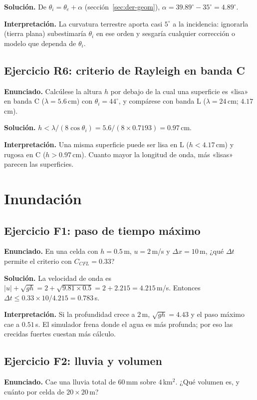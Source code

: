 \documentclass[11pt,a4paper]{article}
\begin{document}
\textbf{Solución.} De $\theta_i=\theta_e+\alpha$ (sección~\ref{sec:der-geom}), $\alpha=39.89^\circ-35^\circ=4.89^\circ$.

\textbf{Interpretación.} La curvatura terrestre aporta casi $5^\circ$ a la incidencia: ignorarla
(tierra plana) subestimaría $\theta_i$ en ese orden y sesgaría cualquier corrección o modelo que dependa de $\theta_i$.

\subsection*{Ejercicio R6: criterio de Rayleigh en banda C}
\textbf{Enunciado.} Calcúlese la altura $h$ por debajo de la cual una superficie es «lisa» en banda C
($\lambda=5.6$\,cm) con $\theta_i=44^\circ$, y compárese con banda L ($\lambda=24$\,cm; $4.17$\,cm).

\textbf{Solución.} $h<\lambda/(8\cos\theta_i)=5.6/(8\times0.7193)=0.97$\,cm.

\textbf{Interpretación.} Una misma superficie puede ser lisa en L ($h<4.17$\,cm) y rugosa en C ($h>0.97$\,cm).
Cuanto mayor la longitud de onda, más «lisas» parecen las superficies.

\section{Inundación}
\label{sec:ej-flood}

\subsection*{Ejercicio F1: paso de tiempo máximo}
\textbf{Enunciado.} En una celda con $h=0.5$\,m, $u=2$\,m/s y $\Delta x=10$\,m, ¿qué $\Delta t$ permite el
criterio con $C_{CFL}=0.33$?

\textbf{Solución.} La velocidad de onda es $|u|+\sqrt{gh}=2+\sqrt{9.81\times0.5}=2+2.215=4.215$\,m/s. Entonces
$\Delta t\le0.33\times10/4.215=0.783$\,s.

\textbf{Interpretación.} Si la profundidad crece a $2$\,m, $\sqrt{gh}=4.43$ y el paso máximo cae a $0.51$\,s. El
simulador frena donde el agua es más profunda; por eso las crecidas fuertes cuestan más cálculo.

\subsection*{Ejercicio F2: lluvia y volumen}
\textbf{Enunciado.} Cae una lluvia total de $60$\,mm sobre $4$\,km$^2$. ¿Qué volumen es, y cuánto por celda de
$20\times20$\,m?
\end{document}
